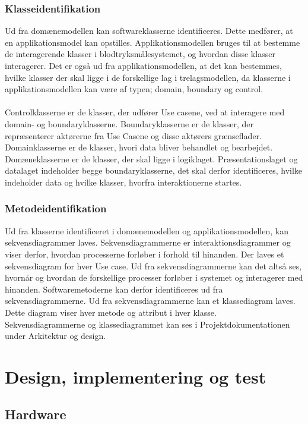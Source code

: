 \subsubsection{Klasseidentifikation}
Ud fra domænemodellen kan softwareklasserne identificeres. Dette medfører, at en applikationsmodel kan opstilles. Applikationsmodellen bruges til at bestemme de interagerende klasser i blodtryksmålesystemet, og hvordan disse klasser interagerer. Det er også ud fra applikationsmodellen, at det kan bestemmes, hvilke klasser der skal ligge i de forskellige lag i trelagsmodellen, da klasserne i applikationsmodellen kan være af typen; domain, boundary og control.\\\\ Controlklasserne er de klasser, der udfører Use casene, ved at interagere med domain- og boundaryklasserne. Boundaryklasserne er de klasser, der repræsenterer aktørerne fra Use Casene og disse aktørers grænseflader. Domainklasserne er de klasser, hvori data bliver behandlet og bearbejdet. Domæneklasserne er de klasser, der skal ligge i logiklaget. Præsentationslaget og datalaget indeholder begge boundaryklasserne, det skal derfor identificeres, hvilke indeholder data og hvilke klasser, hvorfra interaktionerne startes.
\subsubsection{Metodeidentifikation}
Ud fra klasserne identificeret i domænemodellen og applikationsmodellen, kan sekvensdiagrammer laves. Sekvensdiagrammerne er interaktionsdiagrammer og viser derfor, hvordan processerne forløber i forhold til hinanden. Der laves et sekvensdiagram for hver Use case. Ud fra sekvensdiagrammerne kan det altså ses, hvornår og hvordan de forskellige processer forløber i systemet og interagerer med hinanden. Softwaremetoderne kan derfor identificeres ud fra sekvensdiagrammerne. Ud fra sekvensdiagrammerne kan et klassediagram laves. Dette diagram viser hver metode og attribut i hver klasse.\\
Sekvensdiagrammerne og klassediagrammet kan ses i Projektdokumentationen under Arkitektur og design.
\section{Design, implementering og test}
\subsection{Hardware}
